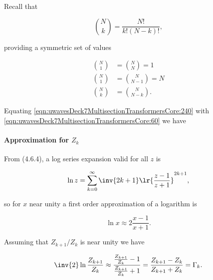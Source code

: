Recall that

\begin{equation}\label{eqn:uwavesDeck7MultisectionTransformersCore:260}
\binom{N}{k} = \frac{N!}{k! (N-k)!},
\end{equation}

providing a symmetric set of values

\begin{equation}\label{eqn:uwavesDeck7MultisectionTransformersCore:280}
\begin{aligned}
\binom{N}{1} &= \binom{N}{N} = 1 \\
\binom{N}{1} &= \binom{N}{N-1} = N \\
\binom{N}{k} &= \binom{N}{N-k}.
\end{aligned}
\end{equation}

Equating \cref{eqn:uwavesDeck7MultisectionTransformersCore:240} with \cref{eqn:uwavesDeck7MultisectionTransformersCore:60} we have


\paragraph{Approximation for \( Z_k \)}

From \citep{NIST:DLMF} (4.6.4), a log series expansion valid for all \( z \) is

\begin{equation}\label{eqn:uwavesDeck7MultisectionTransformersCore:320}
\ln z = \sum_{k = 0}^\infty \inv{2 k + 1} \lr{ \frac{ z - 1 }{z + 1} }^{2k + 1},
\end{equation}

so for \( x \) near unity a first order approximation of a logarithm is

\begin{equation}\label{eqn:uwavesDeck7MultisectionTransformersCore:340}
\ln x \approx 2 \frac{x -1}{x+1}.
\end{equation}

Assuming that \( Z_{k+1}/Z_k \) is near unity we have

\begin{dmath}\label{eqn:uwavesDeck7MultisectionTransformersCore:360}
\inv{2} \ln \frac{Z_{k+1}}{Z_k}
\approx
\frac{ \frac{Z_{k+1}}{Z_k} - 1 }{\frac{Z_{k+1}}{Z_k} + 1}
=
\frac{ Z_{k+1} - Z_k }{Z_{k+1} + Z_k}
=
\Gamma_k.
\end{dmath}

